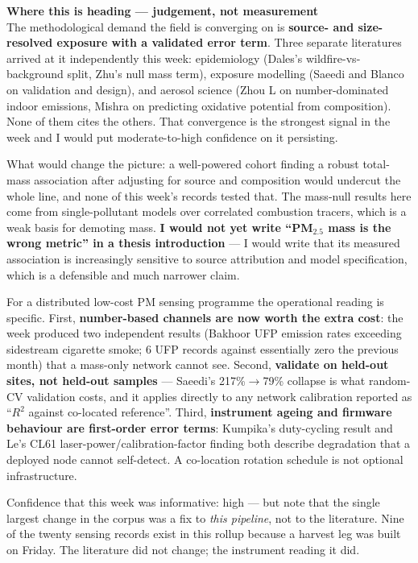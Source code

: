 \documentclass[10pt]{article}
\begin{document}
\vspace{3mm}
\begin{keybox}
{\sffamily\bfseries\footnotesize\color{Deep}Where this is heading --- judgement, not
measurement}\\[1.2mm]
\footnotesize
The methodological demand the field is converging on is \textbf{source- and
size-resolved exposure with a validated error term}. Three separate literatures arrived
at it independently this week: epidemiology (Dales's wildfire-vs-background split, Zhu's
null mass term), exposure modelling (Saeedi and Blanco on validation and design), and
aerosol science (Zhou L on number-dominated indoor emissions, Mishra on predicting
oxidative potential from composition). None of them cites the others. That convergence is
the strongest signal in the week and I would put moderate-to-high confidence on it
persisting.

What would change the picture: a well-powered cohort finding a robust total-mass
association after adjusting for source and composition would undercut the whole line, and
none of this week's records tested that. The mass-null results here come from
single-pollutant models over correlated combustion tracers, which is a weak basis for
demoting mass. \textbf{I would not yet write ``PM$_{2.5}$ mass is the wrong metric'' in a
thesis introduction} --- I would write that its measured association is increasingly
sensitive to source attribution and model specification, which is a defensible and much
narrower claim.

For a distributed low-cost PM sensing programme the operational reading is specific.
First, \textbf{number-based channels are now worth the extra cost}: the week produced two
independent results (Bakhoor UFP emission rates exceeding sidestream cigarette smoke;
6 UFP records against essentially zero the previous month) that a mass-only network
cannot see. Second, \textbf{validate on held-out sites, not held-out samples} --- Saeedi's
217\%$\to$79\% collapse is what random-CV validation costs, and it applies directly to
any network calibration reported as ``$R^2$ against co-located reference''. Third,
\textbf{instrument ageing and firmware behaviour are first-order error terms}: Kumpika's
duty-cycling result and Le's CL61 laser-power/calibration-factor finding both describe
degradation that a deployed node cannot self-detect. A co-location rotation schedule is
not optional infrastructure.

Confidence that this week was informative: high --- but note that the single largest
change in the corpus was a fix to \emph{this pipeline}, not to the literature. Nine of
the twenty sensing records exist in this rollup because a harvest leg was built on
Friday. The literature did not change; the instrument reading it did.
\end{keybox}
\end{document}
